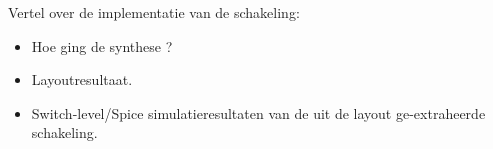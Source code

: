 Vertel over de implementatie van de schakeling:
\begin{itemize}
\item
Hoe ging de synthese ?
\item
Layoutresultaat.
\item
Switch-level/Spice simulatieresultaten van de uit de layout ge-extraheerde schakeling.
\end{itemize}